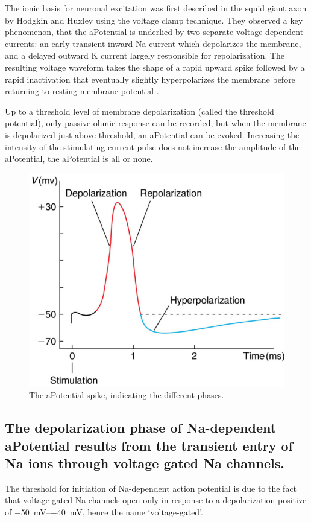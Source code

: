 \documentclass[../../Orator]{subfiles}
\begin{document}
The ionic basis for neuronal excitation was first described in the squid giant axon by Hodgkin and Huxley  using the voltage clamp technique. They observed a key phenomenon, that the \gls{aPotential} is underlied by two separate voltage-dependent currents: an early transient inward \gls{Na} current which depolarizes the membrane, and a delayed outward \gls{K} current largely responsible for repolarization. The resulting voltage waveform takes the shape of a rapid upward spike followed by a rapid inactivation that eventually slightly hyperpolarizes the membrane before returning to resting membrane potential .

Up to a threshold level of membrane depolarization (called the threshold potential), only passive ohmic response can be recorded, but when the membrane is depolarized just above threshold, an \gls{aPotential} can be evoked.  Increasing the intensity of the stimulating current pulse does not increase the amplitude of the \gls{aPotential},  the \gls{aPotential} is all or none. 
\begin{figure}[H]
    \centering
    \includegraphics[width=0.5\linewidth]{Pictures//Anakin/AP.png}
    \caption{The \gls{aPotential} spike, indicating the different phases.}
    \label{fig:AP}
\end{figure}

\subsection{The depolarization phase of \gls{Na}-dependent \gls{aPotential} results from the transient entry of \gls{Na} ions through voltage gated \gls{Na} channels.}
The threshold  for initiation of \gls{Na}-dependent  action  potential is due to the fact that voltage-gated \gls{Na} channels open only  in  response  to  a  depolarization  positive  of \qtyrange{-50}{-40}{\mV}, hence the name `voltage-gated'. 
\end{document}
